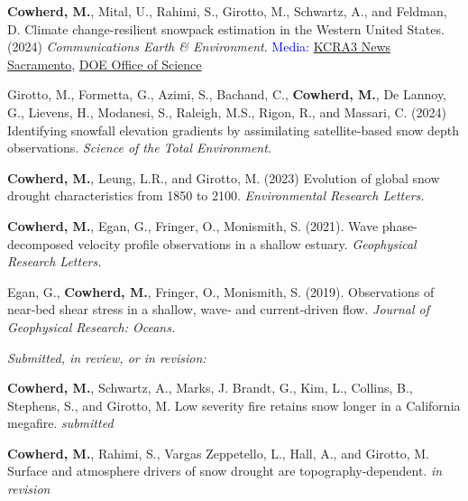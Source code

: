 \item \textbf{Cowherd, M.}, Mital, U., Rahimi, S., Girotto, M., Schwartz, A., and Feldman, D. Climate change-resilient snowpack estimation in the Western United States. (2024) \textit{Communications Earth \& Environment}. \textcolor{blue} {Media: \href{https://www.kcra.com/article/climate-change-estimate-sierra-snowpack-ai/61603975}{KCRA3 News Sacramento}, \href{https://www.energy.gov/science/articles/when-summer-drought-begins-winter-investigating-snow-drought}{DOE Office of Science}}
\item Girotto, M., Formetta, G., Azimi, S., Bachand, C., \textbf{Cowherd, M.}, De Lannoy, G., Lievens, H., Modanesi, S., Raleigh, M.S., Rigon, R., and Massari, C. (2024) Identifying snowfall elevation gradients by assimilating satellite-based snow depth observations. \textit{Science of the Total Environment.}
\item \textbf{Cowherd, M.}, Leung, L.R., and Girotto, M. (2023) Evolution of global snow drought characteristics from 1850 to 2100. \textit{Environmental Research Letters.}
\item \textbf{Cowherd, M.}, Egan, G., Fringer, O., Monismith, S. (2021). Wave phase-decomposed velocity profile observations in a shallow estuary. \textit{Geophysical Research Letters.}
\item Egan, G., \textbf{Cowherd, M.}, Fringer, O., Monismith, S. (2019). Observations of near‐bed shear stress in a shallow, wave‐ and current‐driven flow. \textit{Journal of Geophysical Research: Oceans.}
\item \textit{Submitted, in review, or in revision:}
\item \textbf{Cowherd, M.}, Schwartz, A., Marks, J. Brandt, G., Kim, L., Collins, B., Stephens, S., and Girotto, M. Low severity fire retains snow longer in a California megafire. \textit{submitted}
\item \textbf{Cowherd, M.}, Rahimi, S., Vargas Zeppetello, L., Hall, A., and Girotto, M. Surface and atmosphere drivers of snow drought are topography-dependent. \textit{in revision}
